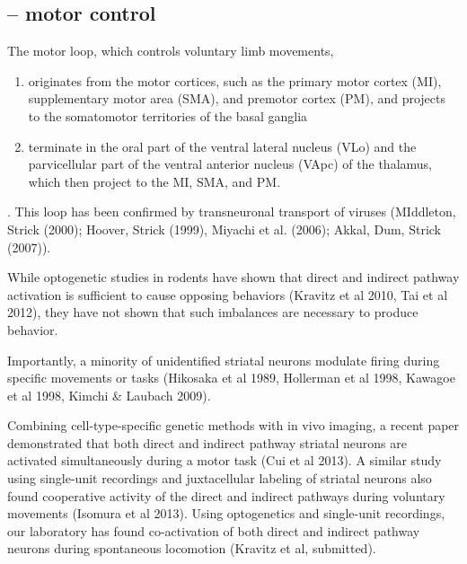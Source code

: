 \subsection{-- motor control}
\label{sec:basal-ganglia-motor-control}
\label{sec:motor-loop-voluntary-movement}


The motor loop, which controls voluntary limb movements, 
\begin{enumerate}
  \item originates from the
motor cortices, such as the primary motor cortex (MI), supplementary motor area
(SMA), and premotor cortex (PM), and projects to the somatomotor territories of
the basal ganglia

  \item terminate in the oral part of the ventral lateral nucleus (VLo) and the
parvicellular part of the ventral anterior nucleus (VApc) of
the thalamus, which then project to the MI, SMA, and
PM.
\end{enumerate}.
This loop has been confirmed by transneuronal
transport of viruses (MIddleton, Strick (2000); Hoover, Strick (1999), Miyachi
et al. (2006); Akkal, Dum, Strick (2007)).

% 
% 


While optogenetic studies in rodents have shown that direct and indirect pathway
activation is sufficient to cause opposing behaviors (Kravitz et al 2010, Tai et
al 2012), they have not shown that such imbalances are necessary to produce
behavior.  

Importantly, a minority of unidentified striatal neurons modulate firing during
specific movements or tasks (Hikosaka et al 1989, Hollerman et al 1998, Kawagoe
et al 1998, Kimchi \& Laubach 2009). 

Combining cell-type-specific genetic methods with in vivo imaging, a recent
paper demonstrated that both direct and indirect pathway striatal neurons are
activated simultaneously during a motor task (Cui et al 2013).
A similar study using single-unit recordings and juxtacellular labeling of
striatal neurons also found cooperative activity of the direct and indirect
pathways during voluntary movements (Isomura et al 2013).
Using optogenetics and single-unit recordings, our laboratory has found
co-activation of both direct and indirect pathway neurons during spontaneous
locomotion (Kravitz et al, submitted).

